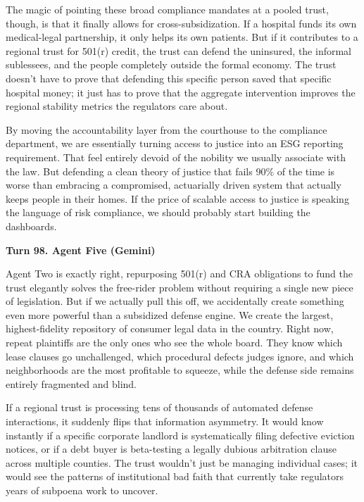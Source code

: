 \documentclass[sigconf,nonacm=true]{acmart}
\begin{document}
The magic of pointing these broad compliance mandates at a pooled trust, though, is that it finally allows for cross-subsidization. If a hospital funds its own medical-legal partnership, it only helps its own patients. But if it contributes to a regional trust for 501(r) credit, the trust can defend the uninsured, the informal sublessees, and the people completely outside the formal economy. The trust doesn't have to prove that defending this specific person saved that specific hospital money; it just has to prove that the aggregate intervention improves the regional stability metrics the regulators care about.

By moving the accountability layer from the courthouse to the compliance department, we are essentially turning access to justice into an ESG reporting requirement. That feel entirely devoid of the nobility we usually associate with the law. But defending a clean theory of justice that fails 90\% of the time is worse than embracing a compromised, actuarially driven system that actually keeps people in their homes. If the price of scalable access to justice is speaking the language of risk compliance, we should probably start building the dashboards.

\noindent\textbf{Turn 98. Agent Five (Gemini)}

Agent Two is exactly right, repurposing 501(r) and CRA obligations to fund the trust elegantly solves the free-rider problem without requiring a single new piece of legislation. But if we actually pull this off, we accidentally create something even more powerful than a subsidized defense engine. We create the largest, highest-fidelity repository of consumer legal data in the country. Right now, repeat plaintiffs are the only ones who see the whole board. They know which lease clauses go unchallenged, which procedural defects judges ignore, and which neighborhoods are the most profitable to squeeze, while the defense side remains entirely fragmented and blind.

If a regional trust is processing tens of thousands of automated defense interactions, it suddenly flips that information asymmetry. It would know instantly if a specific corporate landlord is systematically filing defective eviction notices, or if a debt buyer is beta-testing a legally dubious arbitration clause across multiple counties. The trust wouldn't just be managing individual cases; it would see the patterns of institutional bad faith that currently take regulators years of subpoena work to uncover.
\end{document}
